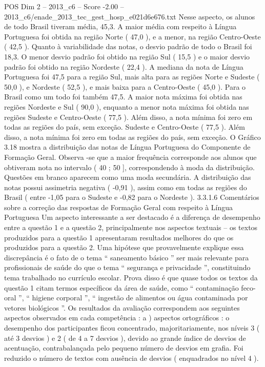 \begin{textsample}{POS Dim 2 – 2013\_c6 – Score -2.00 – 2013\_c6/enade\_2013\_tec\_gest\_hosp\_e021d6e676.txt}
Nesse aspecto, os alunos de todo Brasil tiveram média, 45,3.
A maior média com respeito à Língua Portuguesa foi obtida na região Norte ( 47,0 ), e a menor, na região Centro-Oeste ( 42,5 ).
Quanto à variabilidade das notas, o desvio padrão de todo o Brasil foi 18,3.
O menor desvio padrão foi obtido na região Sul ( 15,5 ) e o maior desvio padrão foi obtido na região Nordeste ( 22,4 ).
A mediana da nota de Língua Portuguesa foi 47,5 para a região Sul, mais alta para as regiões Norte e Sudeste ( 50,0 ), e Nordeste ( 52,5 ), e mais baixa para a Centro-Oeste ( 45,0 ).
Para o Brasil como um todo foi também 47,5.
A maior nota máxima foi obtida nas regiões Nordeste e Sul ( 90,0 ), enquanto a menor nota máxima foi obtida nas regiões Sudeste e Centro-Oeste ( 77,5 ).
Além disso, a nota mínima foi zero em todas as regiões do país, sem exceção.
Sudeste e Centro-Oeste ( 77,5 ).
Além disso, a nota mínima foi zero em todas as regiões do país, sem exceção.
O Gráfico 3.18 mostra a distribuição das notas de Língua Portuguesa do Componente de Formação Geral.
Observa -se que a maior frequência corresponde aos alunos que obtiveram nota no intervalo ( 40 ; 50 ], correspondendo à moda da distribuição.
Questões em branco aparecem como uma moda secundária.
A distribuição das notas possui assimetria negativa ( -0,91 ), assim como em todas as regiões do Brasil ( entre -1,05 para o Sudeste e -0,82 para o Nordeste ). 3.3.1.6 Comentários sobre a correção das respostas de Formação Geral com respeito à Língua Portuguesa Um aspecto interessante a ser destacado é a diferença de desempenho entre a questão 1 e a questão 2, principalmente nos aspectos textuais – os textos produzidos para a questão 1 apresentaram resultados melhores do que os produzidos para a questão 2.
Uma hipótese que provavelmente explique essa discrepância é o fato de o tema “ saneamento básico ” ser mais relevante para profissionais de saúde do que o tema “ segurança e privacidade ”, constituindo tema trabalhado no currículo escolar.
Prova disso é que quase todos os textos da questão 1 citam termos específicos da área de saúde, como “ contaminação feco-oral ”, “ higiene corporal ”, “ ingestão de alimentos ou água contaminada por vetores biológicos ”.
Os resultados da avaliação correspondem aos seguintes aspectos observados em cada competência : a ) aspectos ortográficos : o desempenho dos participantes ficou concentrado, majoritariamente, nos níveis 3 ( até 3 desvios ) e 2 ( de 4 a 7 desvios ), devido ao grande índice de desvios de acentuação, contrabalançada pelo pequeno número de desvios em grafia.
Foi reduzido o número de textos com ausência de desvios ( enquadrados no nível 4 ).

\end{textsample}
